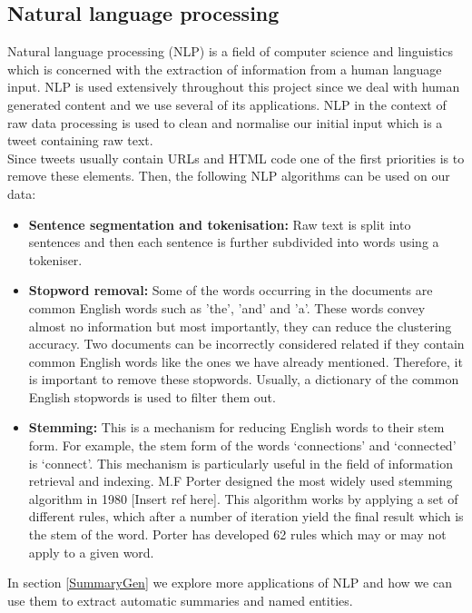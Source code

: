 \subsection{Natural language processing}

Natural language processing (NLP) is a field of computer science and linguistics which is concerned with the extraction of information from a human language 
input. NLP is used extensively throughout this project since we deal with human generated content and we use several of its applications. NLP in the context 
of raw data processing is used to clean and normalise our initial input which is a tweet containing raw text.\\ 
Since tweets usually contain URLs and HTML code one of the first priorities is to remove these elements. Then, the following NLP algorithms
can be used on our data:

\begin{itemize}
 \item \textbf{Sentence segmentation and tokenisation:} Raw text is split into sentences and then each sentence is further subdivided into words using a tokeniser. 
 \item \textbf{Stopword removal:} Some of the words occurring in the documents are common English words such as 'the', 'and' and 'a'. These words convey almost no information 
 but most importantly, they can reduce the clustering accuracy. Two documents can be incorrectly considered related if they contain common English words like the ones
  we have already mentioned. Therefore, it is important to remove these stopwords. Usually, a dictionary of the common English stopwords is used to filter them out.   
 \item \textbf{Stemming:} This is a mechanism for reducing English words to their stem form. For example, the stem form of the words `connections' and `connected' is `connect'. This mechanism is particularly useful in the field of information retrieval and indexing. M.F Porter designed the most widely used stemming algorithm in 1980 [Insert ref here]. This algorithm works by applying a set of different rules, which after a number of iteration yield the final result which is the stem of the word. Porter has developed 62 rules which may or may not apply to a given word.
\end{itemize}\vspace{15pt}
In section \ref{SummaryGen} we explore more applications of NLP and how we can use them to extract automatic summaries and named entities.

